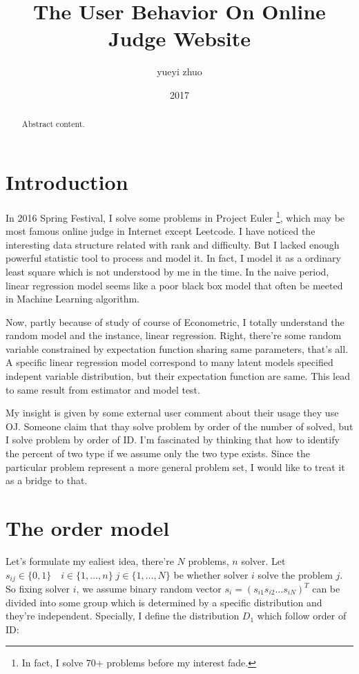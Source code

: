 \documentclass{article}
\title{The User Behavior On Online Judge Website}
\author{yueyi zhuo}
\date{2017}
\begin{document}
\maketitle

\begin{abstract}

Abstract content.

\end{abstract}

\section{Introduction}

In 2016 Spring Festival, I solve some problems in Project Euler 
\footnote{In fact, I solve 70+ problems before my interest fade.}, 
which may be most famous online judge 
in Internet except Leetcode. I have noticed the interesting data structure related with rank and difficulty.
But I lacked enough powerful statistic tool to process and model it. 
In fact, I model it as a ordinary least square which is not understood by me in the time. In the naive period,
linear regression model seems like a poor black box model that often be meeted in Machine Learning algorithm.

Now, partly because of study of course of Econometric, I totally understand the random model and the instance,
linear regression. 
Right, there're some random variable constrained by expectation function sharing same parameters, that's all.
A specific linear regression model correspond to many latent models specified indepent variable distribution,
but their expectation function are same. This lead to same result from estimator and model test.

My insight is given by some external user comment about their usage they use OJ. 
Someone claim that thay solve problem by order of the number of solved, but I solve problem by order of ID.
I'm fascinated by thinking that how to identify the percent of two type if we assume only the two type exists.
Since the particular problem represent a more general problem set, I would like to treat it as a bridge to that.

\section{The order model}

Let's formulate my ealiest idea, there're $N$ problems, $n$ solver. Let 
$s_{ij} \in \{ 0,1 \} \quad i \in \{ 1,\dots,n \} \; j \in \{ 1,\dots,N \}$ be whether solver $i$ solve the problem $j$.
So fixing solver $i$, we assume binary random vector $s_i = ( s_{i1} s_{i2} \dots s_{iN} )^T$ 
can be divided into some group which is determined by a specific distribution and they're independent.
Specially, I define the distribution $D_1$ which follow order of ID:
\end{document}
